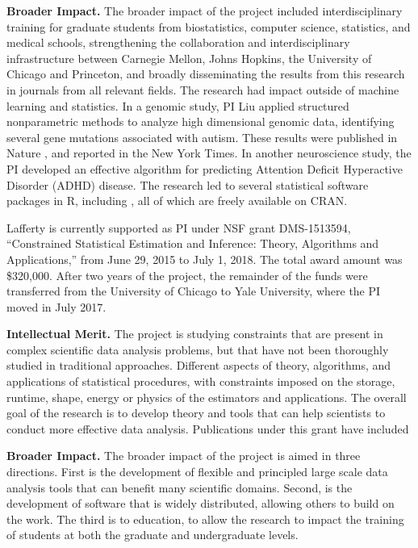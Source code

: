 {\bf Broader Impact.} The broader impact of the project included
interdisciplinary training for graduate students from biostatistics,
computer science, statistics, and medical schools, strengthening the
collaboration and interdisciplinary infrastructure between Carnegie
Mellon, Johns Hopkins, the University of Chicago and Princeton, and
broadly disseminating the results from this research in journals from
all relevant fields. The research had impact outside of machine
learning and statistics. In a genomic study, PI Liu applied structured
nonparametric methods to analyze high dimensional genomic data,
identifying several gene mutations associated with autism.  These
results were published in Nature \citep{patterns}, and reported in the
New York Times. In another neuroscience study, the PI developed an
effective algorithm for predicting Attention Deficit Hyperactive
Disorder (ADHD) disease.  The research led to several statistical
software packages in R, including \citep{huge,fclime,flare}, all of
which are freely available on CRAN.

\vskip10pt \noindent Lafferty is currently supported as PI under NSF
grant DMS-1513594, ``Constrained Statistical Estimation and Inference:
Theory, Algorithms and Applications,'' from June 29, 2015 to July 1,
2018. The total award amount was \$320,000. After two years of the
project, the remainder of the funds were transferred from the
University of Chicago to Yale University, where the PI moved in July
2017.

{\bf Intellectual Merit.}  The project is studying constraints that
are present in complex scientific data analysis problems, but that
have not been thoroughly studied in traditional approaches. Different
aspects of theory, algorithms, and applications of statistical
procedures, with constraints imposed on the storage, runtime, shape,
energy or physics of the estimators and applications. The overall goal
of the research is to develop theory and tools that can help
scientists to conduct more effective data analysis. Publications under
this grant have included \citep{ChatterjeeL18,MishraILH18,
abs-1803-01302,MishraLH17,YangB0L16,ChatterjeeDLZ16,ZhengL16,
MishraZLH15,ZhengL15,ZhuL14,Bonak18}


{\bf Broader Impact.} The broader impact of the project is aimed in
three directions. First is the development of flexible and principled
large scale data analysis tools that can benefit many scientific
domains.  Second, is the development of software that is widely
distributed, allowing others to build on the work. The third is to
education, to allow the research to impact the training of students at
both the graduate and undergraduate levels.


